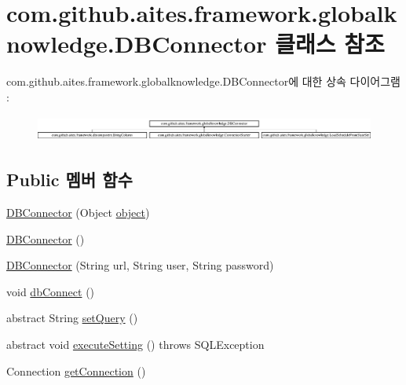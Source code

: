 \hypertarget{classcom_1_1github_1_1aites_1_1framework_1_1globalknowledge_1_1_d_b_connector}{}\section{com.\+github.\+aites.\+framework.\+globalknowledge.\+D\+B\+Connector 클래스 참조}
\label{classcom_1_1github_1_1aites_1_1framework_1_1globalknowledge_1_1_d_b_connector}
com.\+github.\+aites.\+framework.\+globalknowledge.\+D\+B\+Connector에 대한 상속 다이어그램 \+: \begin{figure}[H]
\begin{center}
\leavevmode
\includegraphics[height=0.864197cm]{classcom_1_1github_1_1aites_1_1framework_1_1globalknowledge_1_1_d_b_connector}
\end{center}
\end{figure}
\subsection*{Public 멤버 함수}
\begin{DoxyCompactItemize}
\item 
\mbox{\hyperlink{classcom_1_1github_1_1aites_1_1framework_1_1globalknowledge_1_1_d_b_connector_a77b6f20c18ea2320ff73ab8d135ce00b}{D\+B\+Connector}} (Object \mbox{\hyperlink{classcom_1_1github_1_1aites_1_1framework_1_1globalknowledge_1_1_d_b_connector_ab6f6f9f00c22d311dca48a3a424fd6a3}{object}})
\item 
\mbox{\hyperlink{classcom_1_1github_1_1aites_1_1framework_1_1globalknowledge_1_1_d_b_connector_a300880cfbeb3ff52f9a94a8a4b86f280}{D\+B\+Connector}} ()
\item 
\mbox{\hyperlink{classcom_1_1github_1_1aites_1_1framework_1_1globalknowledge_1_1_d_b_connector_a74c7e19c0558f66f5fe2b61dff2f51ea}{D\+B\+Connector}} (String url, String user, String password)
\item 
void \mbox{\hyperlink{classcom_1_1github_1_1aites_1_1framework_1_1globalknowledge_1_1_d_b_connector_a108808207e33b613b470855bb2be9223}{db\+Connect}} ()
\item 
abstract String \mbox{\hyperlink{classcom_1_1github_1_1aites_1_1framework_1_1globalknowledge_1_1_d_b_connector_aa2a1421b696898fa1a4fb4940e5459c4}{set\+Query}} ()
\item 
abstract void \mbox{\hyperlink{classcom_1_1github_1_1aites_1_1framework_1_1globalknowledge_1_1_d_b_connector_a197a8a098f8ca1f5069af9d37016026c}{execute\+Setting}} ()  throws S\+Q\+L\+Exception
\item 
Connection \mbox{\hyperlink{classcom_1_1github_1_1aites_1_1framework_1_1globalknowledge_1_1_d_b_connector_a94ff414cd6c3dcc402787d96136b5788}{get\+Connection}} ()
\end{DoxyCompactItemize}

